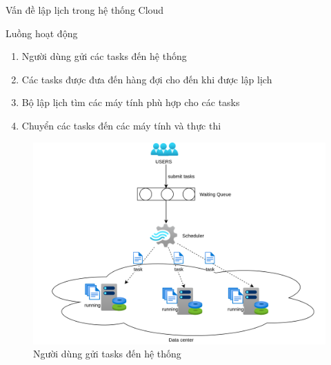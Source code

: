 \documentclass[11pt,xcolor={dvipsnames}, aspectratio=169]{beamer}
\begin{document}
\begin{frame}
{Vấn đề lập lịch trong hệ thống Cloud}
\begin{minipage}[t]{0.48\linewidth}
	\begin{block}
	{Luồng hoạt động}
	\begin{enumerate}
		\item <2-> Người dùng gửi các tasks đến hệ thống
		\item <3->Các tasks được đưa đến hàng đợi cho đến khi được lập lịch
		\item <4->Bộ lập lịch tìm các máy tính phù hợp cho các tasks
		\item <5->Chuyển các tasks đến các máy tính và thực thi
	\end{enumerate}
	\end{block}
\end{minipage}
\hfill
\begin{minipage}[t]{0.48\linewidth}
	\begin{figure}
		\centering
		\includegraphics[scale=0.4]{images/basic_flow.png}
		\caption{Người dùng gửi tasks đến hệ thống}
	\end{figure}
\end{minipage}
\end{frame}

%
\end{document}
